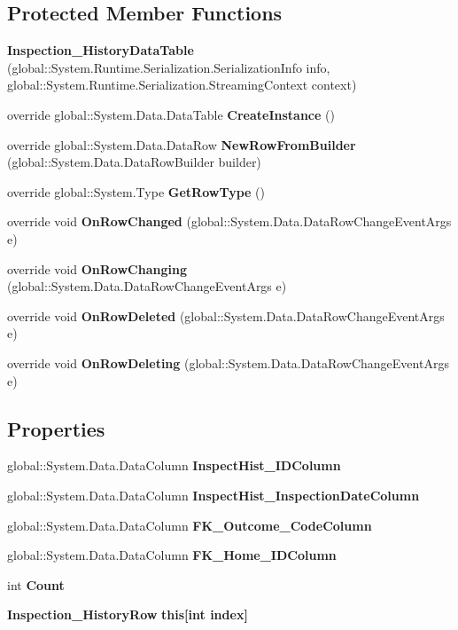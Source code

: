 \subsection*{Protected Member Functions}
\begin{DoxyCompactItemize}
\item 
\textbf{ Inspection\+\_\+\+History\+Data\+Table} (global\+::\+System.\+Runtime.\+Serialization.\+Serialization\+Info info, global\+::\+System.\+Runtime.\+Serialization.\+Streaming\+Context context)
\item 
override global\+::\+System.\+Data.\+Data\+Table \textbf{ Create\+Instance} ()
\item 
override global\+::\+System.\+Data.\+Data\+Row \textbf{ New\+Row\+From\+Builder} (global\+::\+System.\+Data.\+Data\+Row\+Builder builder)
\item 
override global\+::\+System.\+Type \textbf{ Get\+Row\+Type} ()
\item 
override void \textbf{ On\+Row\+Changed} (global\+::\+System.\+Data.\+Data\+Row\+Change\+Event\+Args e)
\item 
override void \textbf{ On\+Row\+Changing} (global\+::\+System.\+Data.\+Data\+Row\+Change\+Event\+Args e)
\item 
override void \textbf{ On\+Row\+Deleted} (global\+::\+System.\+Data.\+Data\+Row\+Change\+Event\+Args e)
\item 
override void \textbf{ On\+Row\+Deleting} (global\+::\+System.\+Data.\+Data\+Row\+Change\+Event\+Args e)
\end{DoxyCompactItemize}
\subsection*{Properties}
\begin{DoxyCompactItemize}
\item 
global\+::\+System.\+Data.\+Data\+Column \textbf{ Inspect\+Hist\+\_\+\+I\+D\+Column}\hspace{0.3cm}{\ttfamily  [get]}
\item 
global\+::\+System.\+Data.\+Data\+Column \textbf{ Inspect\+Hist\+\_\+\+Inspection\+Date\+Column}\hspace{0.3cm}{\ttfamily  [get]}
\item 
global\+::\+System.\+Data.\+Data\+Column \textbf{ F\+K\+\_\+\+Outcome\+\_\+\+Code\+Column}\hspace{0.3cm}{\ttfamily  [get]}
\item 
global\+::\+System.\+Data.\+Data\+Column \textbf{ F\+K\+\_\+\+Home\+\_\+\+I\+D\+Column}\hspace{0.3cm}{\ttfamily  [get]}
\item 
int \textbf{ Count}\hspace{0.3cm}{\ttfamily  [get]}
\item 
\textbf{ Inspection\+\_\+\+History\+Row} \textbf{ this[int index]}\hspace{0.3cm}{\ttfamily  [get]}
\end{DoxyCompactItemize}
